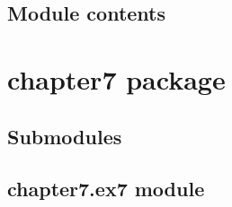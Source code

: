 \documentclass[letterpaper,10pt,english]{sphinxmanual}
\begin{document}

\begin{fulllineitems}
\label{\detokenize{chapter6:chapter6.ex6.is_between}}
\pysigstartsignatures
{}
\pysigstopsignatures
\end{fulllineitems}


\begin{fulllineitems}
\label{\detokenize{chapter6:chapter6.ex6.is_power}}
\pysigstartsignatures
{}
\pysigstopsignatures
\end{fulllineitems}



\subsection{Module contents}
\label{\detokenize{chapter6:module-chapter6}}\label{\detokenize{chapter6:module-contents}}
\sphinxstepscope


\section{chapter7 package}
\label{\detokenize{chapter7:chapter7-package}}\label{\detokenize{chapter7::doc}}

\subsection{Submodules}
\label{\detokenize{chapter7:submodules}}

\subsection{chapter7.ex\sphinxhyphen{}7 module}
\label{\detokenize{chapter7:chapter7-ex-7-module}}
\end{document}
